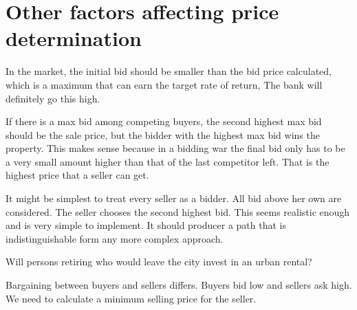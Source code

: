 

\section{Other factors affecting price determination}
In the market, the initial bid should be smaller than the bid price calculated, which is a maximum that can earn the target rate of return, The bank will definitely go this high. 

If there is a  max bid among competing buyers, the second highest max bid should be the sale price, but the bidder with the highest max bid wins the property. This makes sense because in a bidding war the final bid only has to be a very small amount higher than that of the last competitor left.
That is the highest price that a seller can get.

It might be simplest to treat every seller as a bidder. All bid above her own are considered. The seller chooses the second highest bid. This  seems realistic enough and is very simple to implement. It should producer a path that is indistinguishable form any more complex approach. 

Will persons retiring who would leave the city invest in an urban rental?

Bargaining between buyers and sellers differs. Buyers bid low and sellers ask high. {\color{red}We need to calculate a minimum selling price for the seller}.

